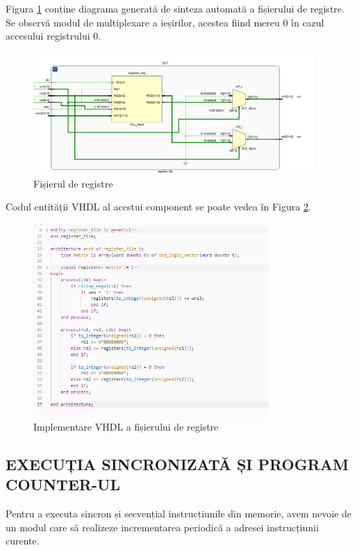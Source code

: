 \documentclass[12pt]{article}
\begin{document}
  \newpage  
  Figura \ref{Figura:34} conține diagrama generată de sinteza automată a fișierului de registre. Se observă modul de multiplexare a ieșirilor, acestea fiind mereu 0 în cazul accesului registrului 0.
 
  \begin{figure}[h!]
 \includegraphics[width=0.95\textwidth]{regfile.png}
 \centering
 \caption{Fișierul de registre}
 \label{Figura:34}
 \end{figure}
 
Codul entității VHDL al acestui component se poate vedea în Figura \ref{Figura:35}.

  \begin{figure}[h!]
 \includegraphics[width=0.8\textwidth]{regfilecode.png}
 \centering
 \caption{Implementare VHDL a fișierului de registre}
 \label{Figura:35}
 \end{figure}
 
\newpage
\subsection{EXECUȚIA SINCRONIZATĂ ȘI PROGRAM COUNTER-UL}

Pentru a executa sincron și secvențial instrucțiunile din memorie, avem nevoie de un modul care să realizeze incrementarea periodică a adresei instrucțiunii curente.
\end{document}
